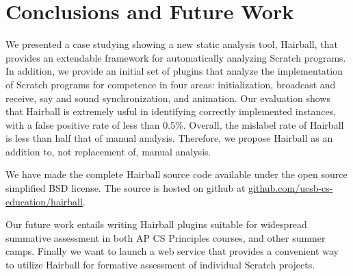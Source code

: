\section{Conclusions and Future Work} 

We presented a case studying showing a new static analysis tool, Hairball, that
provides an extendable framework for automatically analyzing Scratch programs.
In addition, we provide an initial set of plugins that analyze the
implementation of Scratch programs for competence in four areas:
initialization, broadcast and receive, say and sound synchronization, and
animation.  Our evaluation shows that Hairball is extremely usful in
identifying correctly implemented instances, with a false positive rate of
less than 0.5\%.  Overall, the mislabel rate of Hairball is less than half that
of manual analysis.  Therefore, we propose Hairball as an addition to, not
replacement of, manual analysis.

We have made the complete Hairball source code available under the open source
simplified BSD license. The source is hosted on github at
\url{github.com/ucsb-cs-education/hairball}.

Our future work entails writing Hairball plugins suitable for wide\-spread
summative assessment in both AP CS Principles courses, and other summer
camps. Finally we want to launch a web service that provides a convenient way
to utilize Hairball for formative assessment of individual Scratch projects.
